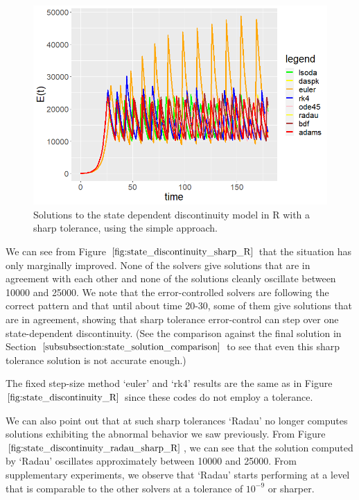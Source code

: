 \begin{figure}[H]
\centering
\includegraphics[width=0.7\linewidth]{./figures/state_discontinuity_sharp_R}
\caption{Solutions to the state dependent discontinuity model in R with a sharp tolerance, using the simple approach.}
\label{fig:state_discontinuity_sharp_R}
\end{figure}

We can see from Figure $\ref{fig:state_discontinuity_sharp_R}$ that the situation has only marginally improved. None of the solvers give solutions that are in agreement with each other and none of the solutions cleanly oscillate between 10000 and 25000. We note that the error-controlled solvers are following the correct pattern and that until about time 20-30, some of them give solutions that are in agreement, showing that sharp tolerance error-control can step over one state-dependent discontinuity. (See the comparison against the final solution in Section $\ref{subsubsection:state_solution_comparison}$ to see that even this sharp tolerance solution is not accurate enough.)

The fixed step-size method `euler' and `rk4' results are the same as in Figure $\ref{fig:state_discontinuity_R}$ since these codes do not employ a tolerance.

We can also point out that at such sharp tolerances `Radau' no longer computes solutions exhibiting the abnormal behavior we saw previously. From Figure $\ref{fig:state_discontinuity_radau_sharp_R}$, we can see that the solution computed by `Radau' oscillates approximately between 10000 and 25000. From supplementary experiments, we observe that `Radau' starts performing at a level that is comparable to the other solvers at a tolerance of $10^{-9}$ or sharper.

